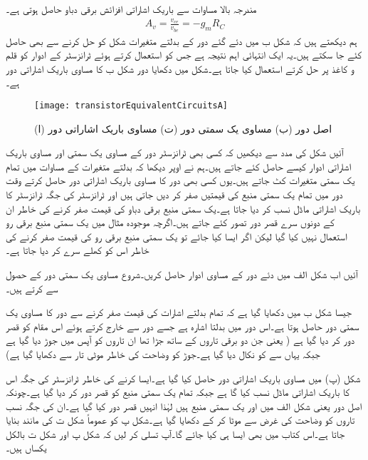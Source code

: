 مندرجہ بالا مساوات سے باریک اشاراتی افزائش برقی دباو  حاصل ہوتی ہے۔
\begin{align}
A_v=\frac{v_{ce}}{v_{be}}=-g_m R_C
\end{align}
ہم دیکھتے ہیں کہ شکل  ب میں دئے گئے دور کے بدلتے متغیرات شکل   کو حل کرنے سے بھی حاصل کئے جا سکتے ہیں۔یہ ایک انتہائی اہم نتیجہ ہے جس کو استعمال کرتے ہوئے ٹرانزسٹر کے ادوار کو قلم و کاغذ پر حل کرتے استعمال کیا جاتا ہے۔شکل   میں دکھایا دور شکل  ب کا مساوی باریک اشاراتی دور ہے۔

\begin{figure}
\centering
\texttt{[image: transistorEquivalentCircuitsA]}
\caption{(ا) اصل دور (ب) مساوی یک سمتی دور (ت) مساوی باریک اشاراتی دور}
\label{شکل_مساوی_دور_الف}
\end{figure}
آئیں شکل   کی مدد سے دیکھیں کہ کسی بھی ٹرانزسٹر دور کے مساوی یک سمتی اور مساوی باریک اشاراتی ادوار کیسے حاصل کئے جاتے ہیں۔ہم نے اوپر دیکھا کہ بدلتے متغیرات کے مساوات میں تمام یک سمتی متغیرات کٹ جاتے ہیں۔یوں کسی بھی دور کا مساوی باریک اشاراتی دور حاصل کرتے وقت دور میں تمام یک سمتی منبع کی قیمتیں صفر کر دیں جاتی ہیں اور ٹرانزسٹر کی جگہ ٹرانزسٹر کا باریک اشاراتی ماڈل نسب کر دیا جاتا ہے۔یک سمتی منبع برقی دباو کی قیمت صفر کرنے کی خاطر ان کے دونوں سرے قصر دور تصور کئے جاتے ہیں۔اگرچہ موجودہ مثال میں یک سمتی منبع برقی رو استعمال نہیں کیا گیا لیکن اگر ایسا کیا جائے تو یک سمتی منبع برقی رو کی قیمت صفر کرنے کی خاطر اس کو کھلے سرے کر دیا جاتا ہے۔

آئیں اب شکل  الف میں دئے دور کے مساوی ادوار حاصل کریں۔شروع مساوی یک سمتی دور کے حصول سے کرتے ہیں۔
	

جیسا شکل  ب میں دکھایا گیا ہے کہ تمام بدلتے اشارات کی قیمت صفر کرنے سے  دور کا مساوی یک سمتی دور حاصل ہوتا ہے۔اس دور میں  بدلتا اشارہ ہے جسے دور سے خارج کرتے ہوئے اس مقام کو قصر دور کر دیا گیا ہے ( یعنی جن دو برقی تاروں کے ساتھ  جڑا تھا ان تاروں کو آپس میں جوڑ دیا گیا ہے جبکہ یہاں سے  کو نکال دیا گیا ہے۔جوڑ کو وضاحت کی خاطر موٹی تار سے دکھایا گیا ہے)

شکل (پ) میں مساوی باریک اشاراتی دور حاصل کیا گیا ہے۔ایسا کرنے کی خاطر ٹرانزسٹر کی جگہ اس کا باریک اشاراتی  ماڈل  نسب کیا گا ہے جبکہ تمام یک سمتی منبع کو قصر دور کر دیا گیا ہے۔چونکہ اصل دور یعنی شکل  الف   میں  اور  یک سمتی منبع ہیں لہٰذا انہیں قصر دور کیا گیا ہے۔ان کی جگہ نسب تاروں کو وضاحت کی غرض سے موٹا کر کے دکھایا گیا ہے۔شکل  پ کو عموماً شکل  ت کی مانند بنایا جاتا ہے۔اس کتاب میں بھی  ایسا ہی کیا جائے گا۔آپ تسلی کر لیں کہ شکل  پ اور شکل  ت بالکل یکساں ہیں۔

